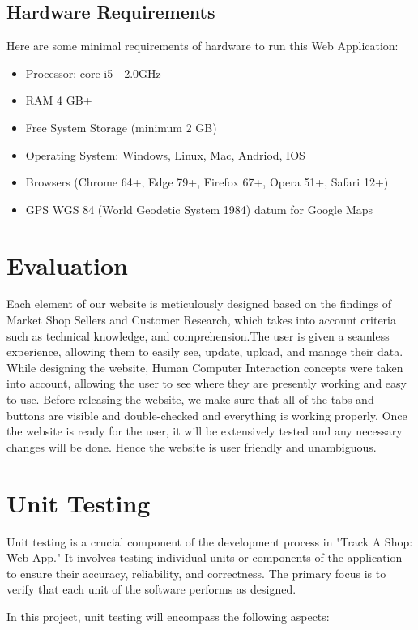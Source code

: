 \subsection{Hardware Requirements}
Here are some minimal requirements of hardware to run this Web Application:
\begin{itemize}
	\item Processor: core i5 - 2.0GHz  
	\item RAM 4 GB+ 
	\item Free System Storage (minimum 2 GB)
	\item Operating System: Windows, Linux, Mac, Andriod, IOS
	\item Browsers (Chrome 64+, Edge 79+, Firefox 67+, Opera 51+, Safari 12+)
	\item GPS WGS 84 (World Geodetic System 1984) datum for Google Maps 
\end{itemize}


\section{Evaluation}
Each element of our website is meticulously designed based on the findings of Market Shop Sellers and Customer Research, which takes into account criteria such as technical knowledge, and comprehension.The user is given a seamless experience, allowing them to easily see, update, upload, and manage their data. While designing the website, Human Computer Interaction concepts \citep{wiki-hci} were taken into account, allowing the user to see where they are presently working and easy to use. Before releasing the website, we make sure that all of the tabs and buttons are visible and double-checked and everything is working properly. Once the website is ready for the user, it will be extensively tested and any necessary changes will be done. Hence the website is user friendly and unambiguous.

\section{Unit Testing}

Unit testing is a crucial component of the development process in "Track A Shop: Web App." It involves testing individual units or components of the application to ensure their accuracy, reliability, and correctness. The primary focus is to verify that each unit of the software performs as designed.

In this project, unit testing will encompass the following aspects:

